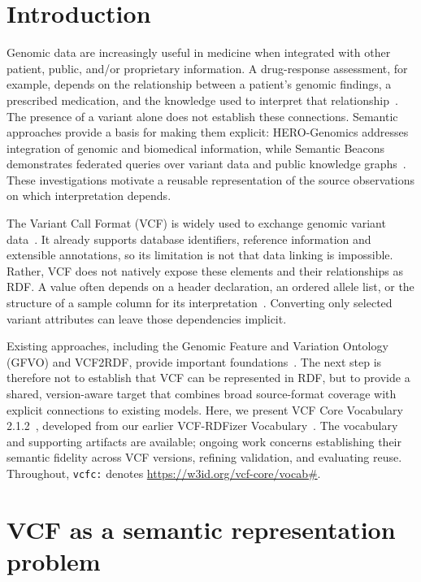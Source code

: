\documentclass{ceurart}
\newcommand{\term}[1]{\texttt{#1}}
\begin{document}
\section{Introduction}

Genomic data are increasingly useful in medicine when integrated with other patient, public, and/or proprietary information.
A drug-response assessment, for example, depends on the relationship between a patient's genomic findings, a prescribed medication, and the knowledge used to interpret that relationship~\cite{lee2022cpic}.
The presence of a variant alone does not establish these connections.
Semantic approaches provide a basis for making them explicit: HERO-Genomics addresses integration of genomic and biomedical information, while Semantic Beacons demonstrates federated queries over variant data and public knowledge graphs~\cite{cazzaro2025hero,bodrug2025semantic}.
These investigations motivate a reusable representation of the source observations on which interpretation depends.

The Variant Call Format (VCF) is widely used to exchange genomic variant data~\cite{danecek2011vcf}.
It already supports database identifiers, reference information and extensible annotations, so its limitation is not that data linking is impossible.
Rather, VCF does not natively expose these elements and their relationships as RDF.
A value often depends on a header declaration, an ordered allele list, or the structure of a sample column for its interpretation~\cite{vcf45}.
Converting only selected variant attributes can leave those dependencies implicit.

Existing approaches, including the Genomic Feature and Variation Ontology (GFVO) and VCF2RDF, provide important foundations~\cite{baran2015gfvo,penha2017vcf2rdf}.
The next step is therefore not to establish that VCF can be represented in RDF, but to provide a shared, version-aware target that combines broad source-format coverage with explicit connections to existing models.
Here, we present VCF Core Vocabulary 2.1.2~\cite{vcfc210}, developed from our earlier VCF-RDFizer Vocabulary~\cite{crum2025semantifying}.
The vocabulary and supporting artifacts are available; ongoing work concerns establishing their semantic fidelity across VCF versions, refining validation, and evaluating reuse.
Throughout, \term{vcfc:} denotes \url{https://w3id.org/vcf-core/vocab#}.

\section{VCF as a semantic representation problem}
\label{sec:vcf}
\end{document}
